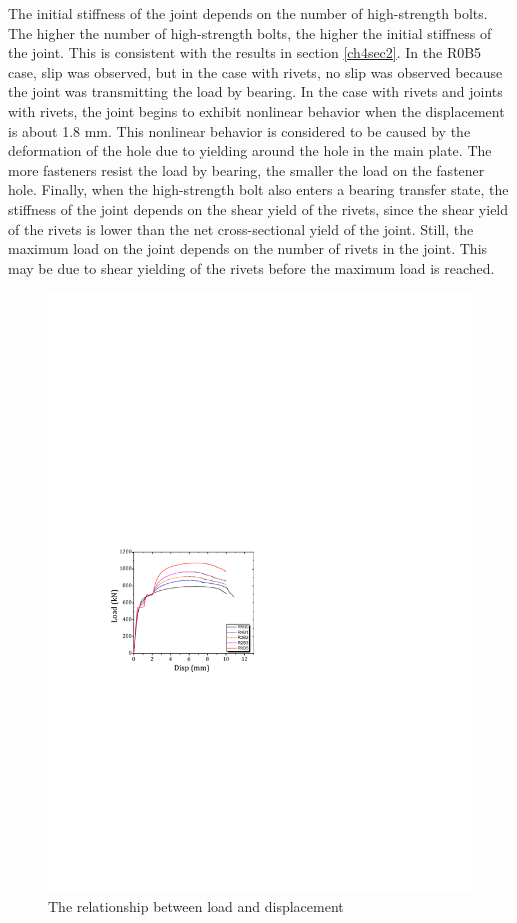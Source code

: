 The initial stiffness of the joint depends on the number of high-strength bolts. The higher the number of high-strength bolts, the higher the initial stiffness of the joint. This is consistent with the results in section \ref{ch4sec2}. In the R0B5 case, slip was observed, but in the case with rivets, no slip was observed because the joint was transmitting the load by bearing. In the case with rivets and joints with rivets, the joint begins to exhibit nonlinear behavior when the displacement is about 1.8 mm. This nonlinear behavior is considered to be caused by the deformation of the hole due to yielding around the hole in the main plate. The more fasteners resist the load by bearing, the smaller the load on the fastener hole. Finally, when the high-strength bolt also enters a bearing transfer state, the stiffness of the joint depends on the shear yield of the rivets, since the shear yield of the rivets is lower than the net cross-sectional yield of the joint. Still, the maximum load on the joint depends on the number of rivets in the joint. This may be due to shear yielding of the rivets before the maximum load is reached.

\begin{figure}
    \centering
    \includegraphics[width=0.7\linewidth]{imgs//ch4/fig-5rld.pdf}
    \caption{The relationship between load and displacement}
    \label{fig-5rld}
\end{figure}

